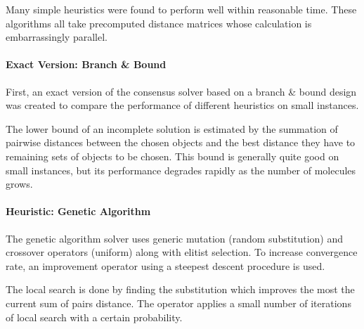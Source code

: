 \documentclass[10pt,letterpaper]{article}
\begin{document}
\noindent Many simple heuristics were found to perform well within reasonable time. These algorithms all take precomputed distance matrices whose calculation is embarrassingly parallel.

\paragraph{Exact Version: Branch \& Bound}
First, an exact version of the consensus solver based on a branch \& bound design was created to compare the performance of different heuristics on small instances.

\noindent The lower bound of an incomplete solution is estimated by the summation of pairwise distances between the chosen objects and the best distance they have to remaining sets of objects to be chosen. This bound is generally quite good on small instances, but its performance degrades rapidly as the number of molecules grows.

\paragraph{Heuristic: Genetic Algorithm}
The genetic algorithm solver uses generic mutation (random substitution) and crossover operators (uniform) along with elitist selection. To increase convergence rate, an improvement operator using a steepest descent procedure is used.

\noindent The local search is done by finding the substitution which improves the most the current sum of pairs distance. The operator applies a small number of iterations of local search with a certain probability.







\newpage

\end{document}
